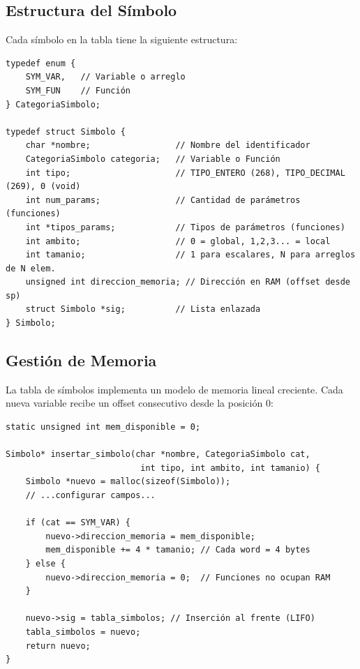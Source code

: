 \subsection{Estructura del Símbolo}

Cada símbolo en la tabla tiene la siguiente estructura:

\begin{lstlisting}[style=cstyle, caption={Estructura Simbolo en symtab.h}]
typedef enum {
    SYM_VAR,   // Variable o arreglo
    SYM_FUN    // Función
} CategoriaSimbolo;

typedef struct Simbolo {
    char *nombre;                 // Nombre del identificador
    CategoriaSimbolo categoria;   // Variable o Función
    int tipo;                     // TIPO_ENTERO (268), TIPO_DECIMAL (269), 0 (void)
    int num_params;               // Cantidad de parámetros (funciones)
    int *tipos_params;            // Tipos de parámetros (funciones)
    int ambito;                   // 0 = global, 1,2,3... = local
    int tamanio;                  // 1 para escalares, N para arreglos de N elem.
    unsigned int direccion_memoria; // Dirección en RAM (offset desde sp)
    struct Simbolo *sig;          // Lista enlazada
} Simbolo;
\end{lstlisting}

\subsection{Gestión de Memoria}

La tabla de símbolos implementa un modelo de memoria lineal creciente. Cada nueva variable recibe un offset consecutivo desde la posición 0:

\begin{lstlisting}[style=cstyle, caption={Asignación de memoria en insertar\_simbolo()}]
static unsigned int mem_disponible = 0;

Simbolo* insertar_simbolo(char *nombre, CategoriaSimbolo cat, 
                           int tipo, int ambito, int tamanio) {
    Simbolo *nuevo = malloc(sizeof(Simbolo));
    // ...configurar campos...
    
    if (cat == SYM_VAR) {
        nuevo->direccion_memoria = mem_disponible;
        mem_disponible += 4 * tamanio; // Cada word = 4 bytes
    } else {
        nuevo->direccion_memoria = 0;  // Funciones no ocupan RAM
    }
    
    nuevo->sig = tabla_simbolos; // Inserción al frente (LIFO)
    tabla_simbolos = nuevo;
    return nuevo;
}
\end{lstlisting}

